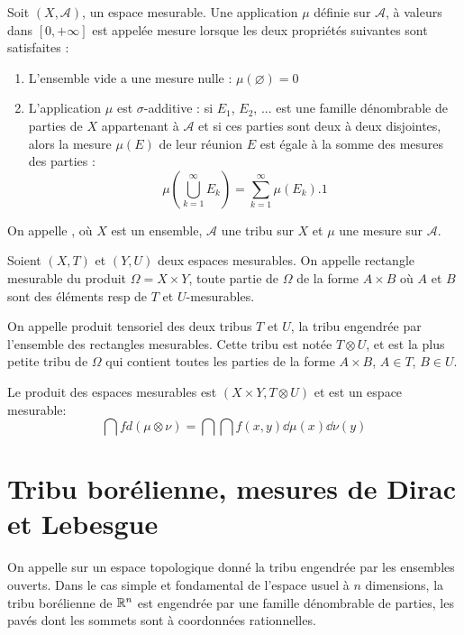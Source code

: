 \begin{definition}[Mesure]
\medskip
Soit $(X,\mathcal{A})$, un espace mesurable.
Une application $\mu$ définie sur $\mathcal{A}$, à valeurs dans $[0,+\infty]$ est appelée
mesure lorsque les deux propriétés suivantes sont satisfaites :
\begin{enumerate}
   \item L'ensemble vide a une mesure nulle : $\mu\left(\varnothing\right)=0$
   \item L'application $\mu$ est $\sigma$-additive :
si $E_1$, $E_2$, ... est une famille dénombrable de parties de $X$ appartenant à
$\mathcal{A}$ et si ces parties sont deux à deux disjointes, alors la mesure $\mu(E)$ de leur réunion
$E$ est égale à la somme des mesures des parties :
\begin{equation}
\mu\left(\bigcup_{k=1}^{\infty}E_{k}\right)=\sum_{k=1}^{\infty}\mu(E_{k}).1
\end{equation}
\end{enumerate}
\end{definition}

On appelle ,
  où $X$ est un ensemble, $\mathcal{A}$ une tribu sur
$X$ et $\mu$ une mesure sur $\mathcal{A}$.

\medskip
{}
Soient $(X,T)$ et $(Y,U)$ deux espaces mesurables.
On appelle rectangle mesurable du produit $\Omega=X\times Y$, toute partie de $\Omega$
de la forme $A\times B$ où $A$ et $B$ sont des éléments resp de $T$ et $U$-mesurables.

On appelle produit tensoriel des deux tribus $T$ et $U$, la tribu
engendrée par l'ensemble des rectangles mesurables.
Cette tribu est notée $T \otimes U$, et est la plus petite tribu de $\Omega$ qui contient
toutes les parties de la forme $A\times B$, $A\in T$, $B\in U$.

Le produit des espaces mesurables est $(X\times Y, T \otimes U)$ et est un espace mesurable:
\begin{equation}
\dint fd(\mu \otimes \nu) = \dint\dint f(x,y) \dd\mu(x)\dd\nu(y)
\end{equation}

\medskip
\section{Tribu borélienne, mesures de Dirac et Lebesgue}

\begin{definition}
On appelle  sur un espace topologique donné la tribu engendrée par les
ensembles ouverts.
Dans le cas simple et fondamental de l'espace usuel à $n$ dimensions, la tribu borélienne de $\mathbb R^n$
est engendrée par une famille dénombrable de parties, les pavés dont les sommets sont à
coordonnées rationnelles.
\end{definition}

